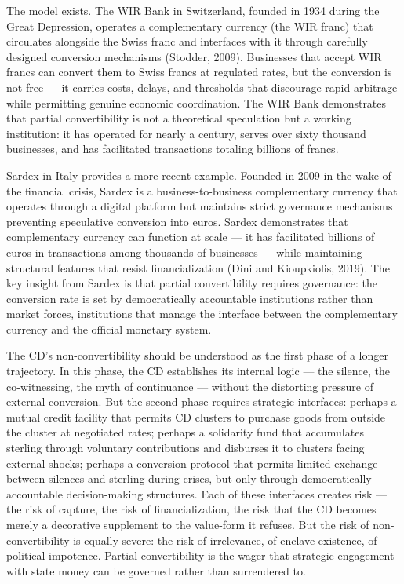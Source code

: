 The model exists. The WIR Bank in Switzerland, founded in 1934 during the Great Depression, operates a complementary currency (the WIR franc) that circulates alongside the Swiss franc and interfaces with it through carefully designed conversion mechanisms (Stodder, 2009). Businesses that accept WIR francs can convert them to Swiss francs at regulated rates, but the conversion is not free — it carries costs, delays, and thresholds that discourage rapid arbitrage while permitting genuine economic coordination. The WIR Bank demonstrates that partial convertibility is not a theoretical speculation but a working institution: it has operated for nearly a century, serves over sixty thousand businesses, and has facilitated transactions totaling billions of francs.

Sardex in Italy provides a more recent example. Founded in 2009 in the wake of the financial crisis, Sardex is a business-to-business complementary currency that operates through a digital platform but maintains strict governance mechanisms preventing speculative conversion into euros. Sardex demonstrates that complementary currency can function at scale — it has facilitated billions of euros in transactions among thousands of businesses — while maintaining structural features that resist financialization (Dini and Kioupkiolis, 2019). The key insight from Sardex is that partial convertibility requires governance: the conversion rate is set by democratically accountable institutions rather than market forces, institutions that manage the interface between the complementary currency and the official monetary system.

The CD's non-convertibility should be understood as the first phase of a longer trajectory. In this phase, the CD establishes its internal logic — the silence, the co-witnessing, the myth of continuance — without the distorting pressure of external conversion. But the second phase requires strategic interfaces: perhaps a mutual credit facility that permits CD clusters to purchase goods from outside the cluster at negotiated rates; perhaps a solidarity fund that accumulates sterling through voluntary contributions and disburses it to clusters facing external shocks; perhaps a conversion protocol that permits limited exchange between silences and sterling during crises, but only through democratically accountable decision-making structures. Each of these interfaces creates risk — the risk of capture, the risk of financialization, the risk that the CD becomes merely a decorative supplement to the value-form it refuses. But the risk of non-convertibility is equally severe: the risk of irrelevance, of enclave existence, of political impotence. Partial convertibility is the wager that strategic engagement with state money can be governed rather than surrendered to.

